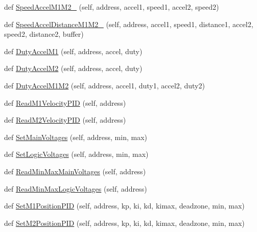 \begin{DoxyCompactItemize}
\item 
def \mbox{\hyperlink{classtoxic__hardware_1_1roboclaw__3_1_1Roboclaw_aec8e361da8050e7687485939866af28d}{Speed\+Accel\+M1\+M2\+\_}} (self, address, accel1, speed1, accel2, speed2)
\item 
def \mbox{\hyperlink{classtoxic__hardware_1_1roboclaw__3_1_1Roboclaw_a262f702618078f6dc8c7d2613c4770c4}{Speed\+Accel\+Distance\+M1\+M2\+\_}} (self, address, accel1, speed1, distance1, accel2, speed2, distance2, buffer)
\item 
def \mbox{\hyperlink{classtoxic__hardware_1_1roboclaw__3_1_1Roboclaw_a3e8db4c3a64d8230578ccc0dce9c2caf}{Duty\+Accel\+M1}} (self, address, accel, duty)
\item 
def \mbox{\hyperlink{classtoxic__hardware_1_1roboclaw__3_1_1Roboclaw_adc795ecad66a7f319294de40403b625b}{Duty\+Accel\+M2}} (self, address, accel, duty)
\item 
def \mbox{\hyperlink{classtoxic__hardware_1_1roboclaw__3_1_1Roboclaw_a1a6f60c733025ed6a721f300006ae2bf}{Duty\+Accel\+M1\+M2}} (self, address, accel1, duty1, accel2, duty2)
\item 
def \mbox{\hyperlink{classtoxic__hardware_1_1roboclaw__3_1_1Roboclaw_a6f554fdc1a5eb500becfa0671e74c1bd}{Read\+M1\+Velocity\+P\+ID}} (self, address)
\item 
def \mbox{\hyperlink{classtoxic__hardware_1_1roboclaw__3_1_1Roboclaw_a495861b7a7488d55617c0547113a4c19}{Read\+M2\+Velocity\+P\+ID}} (self, address)
\item 
def \mbox{\hyperlink{classtoxic__hardware_1_1roboclaw__3_1_1Roboclaw_a797048ba29a08f145dba4109c6bc8dc7}{Set\+Main\+Voltages}} (self, address, min, max)
\item 
def \mbox{\hyperlink{classtoxic__hardware_1_1roboclaw__3_1_1Roboclaw_a23f46409e7e8fe2d593d936323988fa3}{Set\+Logic\+Voltages}} (self, address, min, max)
\item 
def \mbox{\hyperlink{classtoxic__hardware_1_1roboclaw__3_1_1Roboclaw_ab40f8380e6392ae794fd63cec88a59a5}{Read\+Min\+Max\+Main\+Voltages}} (self, address)
\item 
def \mbox{\hyperlink{classtoxic__hardware_1_1roboclaw__3_1_1Roboclaw_a479e429da4c5b9232c1879630ba7bb68}{Read\+Min\+Max\+Logic\+Voltages}} (self, address)
\item 
def \mbox{\hyperlink{classtoxic__hardware_1_1roboclaw__3_1_1Roboclaw_a1c1454fcbcafb085c745d018c4814896}{Set\+M1\+Position\+P\+ID}} (self, address, kp, ki, kd, kimax, deadzone, min, max)
\item 
def \mbox{\hyperlink{classtoxic__hardware_1_1roboclaw__3_1_1Roboclaw_a33050c23f208c758c84beba976e75a9a}{Set\+M2\+Position\+P\+ID}} (self, address, kp, ki, kd, kimax, deadzone, min, max)

\end{DoxyCompactItemize}
